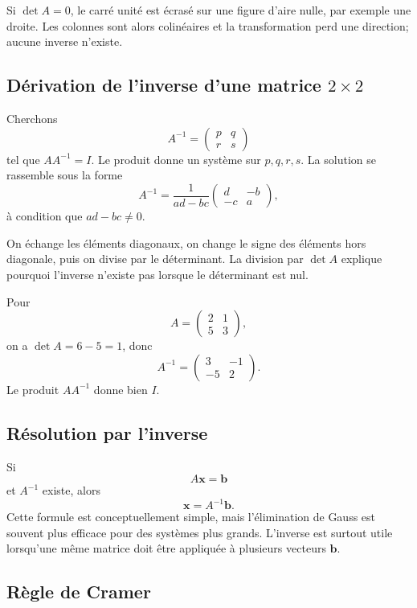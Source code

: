 \documentclass[12pt,a4paper,openany]{book}
\begin{document}
Si $\det A=0$, le carré unité est écrasé sur une figure d'aire nulle, par exemple une droite. Les colonnes sont alors colinéaires et la transformation perd une direction; aucune inverse n'existe.

\subsection{Dérivation de l'inverse d'une matrice \texorpdfstring{$2\times2$}{2 par 2}}

Cherchons
\[
A^{-1}=\begin{pmatrix}p&q\\r&s\end{pmatrix}
\]
tel que $AA^{-1}=I$. Le produit donne un système sur $p,q,r,s$. La solution se rassemble sous la forme
\[
A^{-1}=\frac1{ad-bc}
\begin{pmatrix}d&-b\\-c&a\end{pmatrix},
\]
à condition que $ad-bc\neq0$.

On échange les éléments diagonaux, on change le signe des éléments hors diagonale, puis on divise par le déterminant. La division par $\det A$ explique pourquoi l'inverse n'existe pas lorsque le déterminant est nul.

\begin{examplebox}
Pour
\[
A=\begin{pmatrix}2&1\\5&3\end{pmatrix},
\]
on a $\det A=6-5=1$, donc
\[
A^{-1}=\begin{pmatrix}3&-1\\-5&2\end{pmatrix}.
\]
Le produit $AA^{-1}$ donne bien $I$.
\end{examplebox}

\subsection{Résolution par l'inverse}

Si
\[
A\mathbf x=\mathbf b
\]
et $A^{-1}$ existe, alors
\[
\mathbf x=A^{-1}\mathbf b.
\]
Cette formule est conceptuellement simple, mais l'élimination de Gauss est souvent plus efficace pour des systèmes plus grands. L'inverse est surtout utile lorsqu'une même matrice doit être appliquée à plusieurs vecteurs $\mathbf b$.

\subsection{Règle de Cramer}
\end{document}
